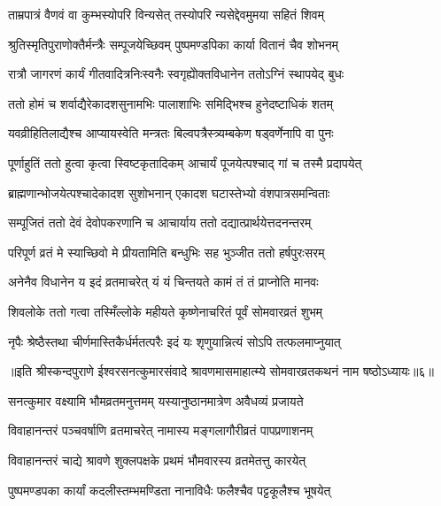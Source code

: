 \twolineshloka
{ताम्रपात्रं वैणवं वा कुम्भस्योपरि विन्यसेत्}
{तस्योपरि न्यसेद्देवमुमया सहितं शिवम्} %

\twolineshloka
{श्रुतिस्मृतिपुराणोक्तैर्मन्त्रैः सम्पूजयेच्छिवम्}
{पुष्पमण्डपिका कार्या वितानं चैव शोभनम्} %

\twolineshloka
{रात्रौ जागरणं कार्यं गीतवादित्रनिःस्वनैः}
{स्वगृह्येोक्तविधानेन ततोऽग्निं स्थापयेद् बुधः} %

\twolineshloka
{ततो होमं च शर्वाद्यैरेकादशसुनामभिः}
{पालाशाभिः समिद्भिश्च हुनेदष्टाधिकं शतम्} %

\twolineshloka
{यवव्रीहितिलाद्यैश्च आप्यायस्वेति मन्त्रतः}
{बिल्वपत्रैस्त्र्यम्बकेण षड्वर्णेनापि वा पुनः} %

\twolineshloka
{पूर्णाहुतिं ततो हुत्वा कृत्वा स्विष्टकृतादिकम्}
{आचार्यं पूजयेत्पश्चाद् गां च तस्मै प्रदापयेत्} %

\twolineshloka
{ब्राह्मणान्भोजयेत्पश्चादेकादश सुशोभनान्}
{एकादश घटास्तेभ्यो वंशपात्रसमन्विताः} %

\twolineshloka
{सम्पूजितं ततो देवं देवोपकरणानि च}
{आचार्याय ततो दद्यात्प्रार्थयेत्तदनन्तरम्} %

\twolineshloka
{परिपूर्ण व्रतं मे स्याच्छिवो मे प्रीयतामिति}
{बन्धुभिः सह भुञ्जीत ततो हर्षपुरःसरम्} %

\twolineshloka
{अनेनैव विधानेन य इदं व्रतमाचरेत्}
{यं यं चिन्तयते कामं तं तं प्राप्नोति मानवः} %

\twolineshloka
{शिवलोके ततो गत्वा तस्मिँल्लोके महीयते}
{कृष्णेनाचरितं पूर्वं सोमवारव्रतं शुभम्} %

\twolineshloka
{नृपैः श्रेष्ठैस्तथा चीर्णमास्तिकैर्धर्मतत्परैः}
{इदं यः शृणुयान्नित्यं सोऽपि तत्फलमाप्नुयात्} %


{॥इति श्रीस्कन्दपुराणे ईश्वरसनत्कुमारसंवादे श्रावणमासमाहात्म्ये सोमवारव्रतकथनं नाम षष्ठोऽध्यायः॥६॥}




\twolineshloka
{सनत्कुमार वक्ष्यामि भौमव्रतमनुत्तमम्}
{यस्यानुष्ठानमात्रेण अवैधव्यं प्रजायते} %

\twolineshloka
{विवाहानन्तरं पञ्चवर्षाणि व्रतमाचरेत्}
{नामास्य मङ्गलागौरीव्रतं पापप्रणाशनम्} %

\twolineshloka
{विवाहानन्तरं चाद्ये श्रावणे शुक्लपक्षके}
{प्रथमं भौमवारस्य व्रतमेतत्तु कारयेत्} %

\twolineshloka
{पुष्पमण्डपका कार्यां कदलीस्तम्भमण्डिता}
{नानाविधैः फलैश्चैव पट्टकूलैश्च भूषयेत्} %

